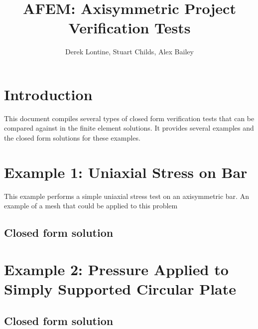 \documentclass[10pt,letterpaper]{report}
\author{Derek Lontine, Stuart Childs, Alex Bailey}
\title{AFEM: Axisymmetric Project Verification Tests}
\numberwithin{equation}{chapter}
\begin{document}
\maketitle

\chapter{Introduction}
This document compiles several types of closed form verification tests that can be compared against in the finite element solutions. It provides several examples and the closed form solutions for these examples. 

\chapter{Example 1: Uniaxial Stress on Bar}
This example performs a simple uniaxial stress test on an axisymmetric bar. An example of a mesh that could be applied to this problem 

\section{Closed form solution}

\chapter{Example 2: Pressure Applied to Simply Supported Circular Plate}

\section{Closed form solution}
\end{document}
